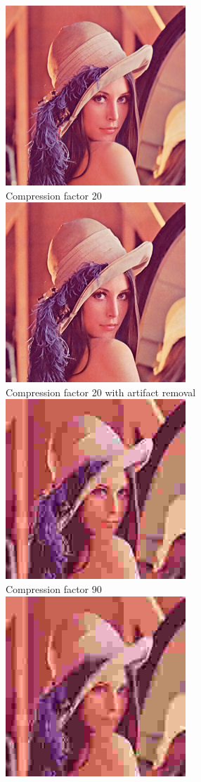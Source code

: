 \documentclass[12pt]{article}
\begin{document}
\begin{center}
\includegraphics{../images/III1LenaC20.eps}\\
Compression factor 20 \\ 
\includegraphics{../images/III1LenaC20r.eps}\\
Compression factor 20 with artifact removal\\
\includegraphics{../images/III1LenaC90.eps}\\
Compression factor 90 \\
\includegraphics{../images/III1LenaC90r.eps}\\

\end{center}
\end{document}
